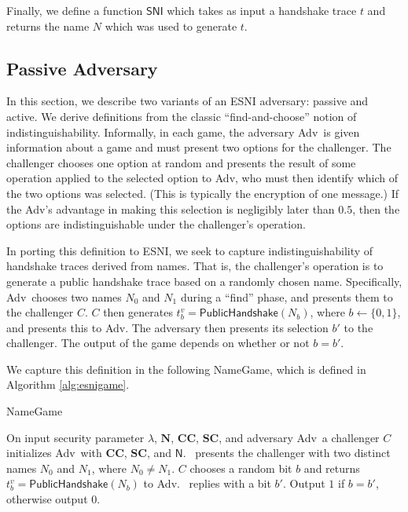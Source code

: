 \documentclass{article}
\theoremstyle{definition}
\newcommand{\adv}{{\sf Adv}}
\theoremstyle{definition}
\begin{document}
Finally, we define a function $\mathsf{SNI}$ which takes as input a handshake trace $t$
and returns the name $N$ which was used to generate $t$. 

\subsection{Passive Adversary}

In this section, we describe two variants of an ESNI adversary: passive and active. We derive 
definitions from the classic ``find-and-choose'' notion of indistinguishability. Informally, 
in each game, the adversary \adv\ is given information about a game and must present two options
for the challenger. The challenger chooses one option at random and presents the result of some 
operation applied to the selected option to \adv, who must then identify which of 
the two options was selected. (This is typically the encryption of one message.) If the 
\adv's advantage in making this selection is negligibly later than $0.5$, then the options 
are indistinguishable under the challenger's operation.

In porting this definition to ESNI, we seek to capture indistinguishability of handshake traces
derived from names. That is, the challenger's operation is to generate a public handshake trace 
based on a randomly chosen name. Specifically, \adv\ chooses two names $N_0$ and $N_1$ during
a ``find'' phase, and presents them to the challenger $C$. $C$ then generates 
$t_b^v = \mathsf{PublicHandshake}(N_b)$, where $b \gets \{0,1\}$, and presents this to \adv. 
The adversary then presents its selection $b'$ to the challenger. The output of the game
depends on whether or not $b = b'$. 

We capture this definition in the following {\sf NameGame}, which is defined in Algorithm \ref{alg:esnigame}.

\begin{algorithm}
\caption{{\sf NameGame}} 
\label{alg:esnigame}
\begin{algorithmic}[1]
  \STATE On input security parameter $\lambda$, $\mathbf{N}$, $\mathbf{CC}$, $\mathbf{SC}$, 
  and adversary \adv\, a challenger $C$ initializes \adv\ with $\mathbf{CC}$, $\mathbf{SC}$, and $\mathsf{N}$. 
  \STATE \adv\ presents the challenger with two distinct names $N_0$ and $N_1$, where $N_0 \not= N_1$.
  \STATE $C$ chooses a random bit $b$ and returns $t_b^v = \mathsf{PublicHandshake}(N_b)$ to \adv.
  \STATE \adv\ replies with a bit $b'$.
  \STATE Output $1$ if $b = b'$, otherwise output $0$.
\end{algorithmic}
\end{algorithm}
\end{document}
